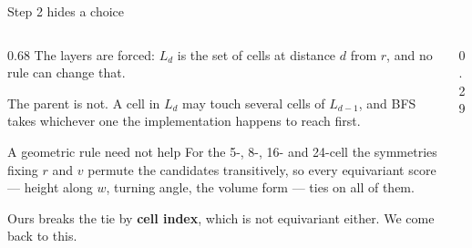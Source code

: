 \documentclass[aspectratio=43,11pt]{beamer}
\begin{document}
\begin{frame}{Step 2 hides a choice}
  \begin{columns}[T]
    \begin{column}{0.68\textwidth}
      \small
      The layers are forced: $L_d$ is the set of cells at distance $d$
      from $r$, and no rule can change that.
      \smallskip

      The \alert{parent} is not. A cell in $L_d$ may touch several
      cells of $L_{d-1}$, and BFS takes whichever one the
      implementation happens to reach first.
      \smallskip

      \begin{block}{A geometric rule need not help}
        For the 5-, 8-, 16- and 24-cell the symmetries fixing $r$ and
        $v$ permute the candidates transitively, so \alert{every}
        equivariant score --- height along $w$, turning angle, the
        volume form --- ties on all of them.
      \end{block}
      \smallskip

      Ours breaks the tie by \textbf{cell index}, which is not
      equivariant either. \alert{We come back to this.}
    \end{column}
    \begin{column}{0.29\textwidth}
      \centering


\end{column}
\end{columns}
\end{frame}
\end{document}

